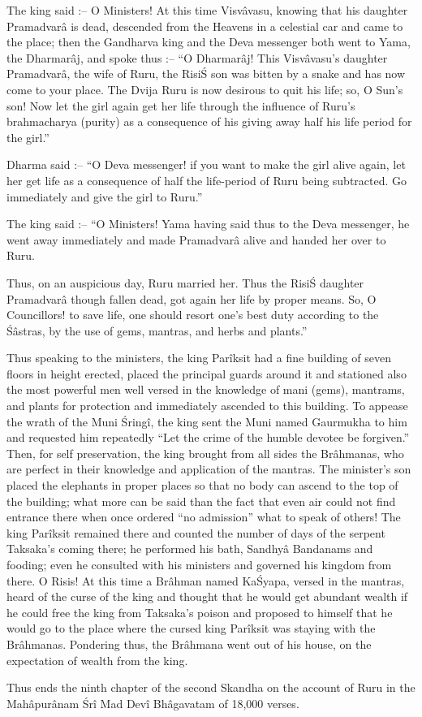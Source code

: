The king said :-- O Ministers! At this time Visv\^avasu, knowing that his daughter Pramadvar\^a is dead, descended from the Heavens in a celestial car and came to the place; then the Gandharva king and the Deva messenger both went to Yama, the Dharmar\^aj, and spoke thus :-- ``O Dharmar\^aj! This Visv\^avasu's daughter Pramadvar\^a, the wife of Ruru, the Risi\'S son was bitten by a snake and has now come to your place. The Dvija Ruru is now desirous to quit his life; so, O Sun's son! Now let the girl again get her life through the influence of Ruru's brahmacharya (purity) as a consequence of his giving away half his life period for the girl.''

Dharma said :-- ``O Deva messenger! if you want to make the girl alive again, let her get life as a consequence of half the life-period of Ruru being subtracted. Go immediately and give the girl to Ruru.''

The king said :-- ``O Ministers! Yama having said thus to the Deva messenger, he went away immediately and made Pramadvar\^a alive and handed her over to Ruru.

Thus, on an auspicious day, Ruru married her. Thus the Risi\'S daughter Pramadvar\^a though fallen dead, got again her life by proper means. So, O Councillors! to save life, one should resort one's best duty according to the \'S\^astras, by the use of gems, mantras, and herbs and plants.''

Thus speaking to the ministers, the king Par\^iksit had a fine building of seven floors in height erected, placed the principal guards around it and stationed also the most powerful men well versed in the knowledge of mani (gems), mantrams, and plants for protection and immediately ascended to this building. To appease the wrath of the Muni \'Sring\^i, the king sent the Muni named Gaurmukha to him and requested him repeatedly ``Let the crime of the humble devotee be forgiven.'' Then, for self preservation, the king brought from all sides the Br\^ahmanas, who are perfect in their knowledge and application of the mantras. The minister's son placed the elephants in proper places so that no body can ascend to the top of the building; what more can be said than the fact that even air could not find entrance there when once ordered ``no admission'' what to speak of others! The king Par\^iksit remained there and counted the number of days of the serpent Taksaka's coming there; he performed his bath, Sandhy\^a Bandanams and fooding; even he consulted with his ministers and governed his kingdom from there. O Risis! At this time a Br\^ahman named Ka\'Syapa, versed in the mantras, heard of the curse of the king and thought that he would get abundant wealth if he could free the king from Taksaka's poison and proposed to himself that he would go to the place where the cursed king Par\^iksit was staying with the Br\^ahmanas. Pondering thus, the Br\^ahmana went out of his house, on the expectation of wealth from the king.

Thus ends the ninth chapter of the second Skandha on the account of Ruru in the Mah\^apur\^anam \'Sr\^i Mad Dev\^i Bh\^agavatam of 18,000 verses.

